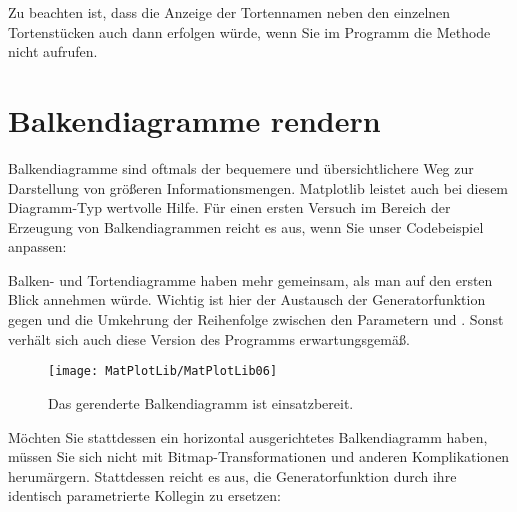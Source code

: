 Zu beachten ist, dass die Anzeige der Tortennamen neben den einzelnen Tortenstücken auch dann erfolgen würde, wenn Sie im Programm die Methode  nicht aufrufen.


\section{Balkendiagramme rendern}
Balkendiagramme sind oftmals der bequemere und übersichtlichere Weg zur Darstellung von größeren Informationsmengen. Matplotlib leistet auch bei diesem Diagramm-Typ wertvolle Hilfe. Für einen ersten Versuch im Bereich der Erzeugung von Balkendiagrammen reicht es aus, wenn Sie unser Codebeispiel anpassen:

\medskip






\medskip

Balken- und Tortendiagramme haben mehr gemeinsam, als man auf den ersten Blick annehmen würde. Wichtig ist hier der Austausch der Generatorfunktion  gegen  und die Umkehrung der Reihenfolge zwischen den Parametern  und . Sonst verhält sich auch diese Version des Programms erwartungsgemäß.

\begin{figure}
  \begin{center}  
    \texttt{[image: MatPlotLib/MatPlotLib06]}      
        
    \caption{Das gerenderte Balkendiagramm ist einsatzbereit.}\label{Matplotlib06}
  \end{center}    
\end{figure}

Möchten Sie stattdessen ein horizontal ausgerichtetes Balkendiagramm haben, müssen Sie sich nicht mit Bitmap-Transformationen und anderen Komplikationen herumärgern. Stattdessen reicht es aus, die Generatorfunktion  durch ihre identisch parametrierte Kollegin  zu ersetzen:

\medskip



